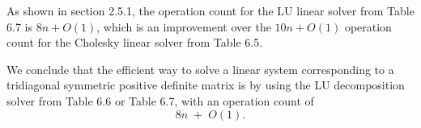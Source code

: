 \begin{table}[H]
\centering
\caption{Tridiagonal spd linear solver using LU decomposition}
\end{table}

As shown in section 2.5.1, the operation count for the LU linear solver from Table 6.7
is $8n + O(1)$, which is an improvement over the $10n + O(1)$ operation count for the
Cholesky linear solver from Table 6.5.

We conclude that the efficient way to solve a linear system corresponding to a
tridiagonal symmetric positive definite matrix is by using the LU decomposition solver
from Table 6.6 or Table 6.7, with an operation count of
\begin{equation}
8n \;+\; O(1).
\end{equation}
